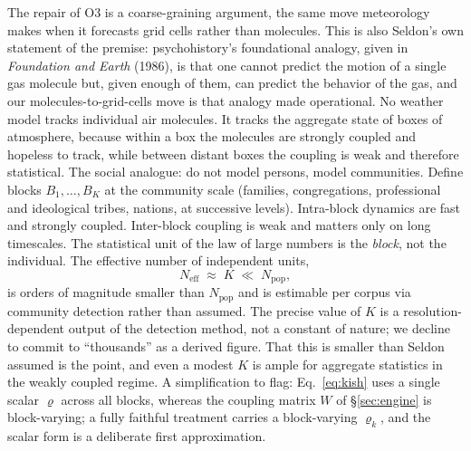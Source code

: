 \documentclass[11pt]{article}
\begin{document}
The repair of O3 is a coarse-graining argument, the same move meteorology makes when it forecasts grid cells rather than molecules. This is also Seldon's own statement of the premise: psychohistory's foundational analogy, given in \emph{Foundation and Earth} (1986), is that one cannot predict the motion of a single gas molecule but, given enough of them, can predict the behavior of the gas, and our molecules-to-grid-cells move is that analogy made operational. No weather model tracks individual air molecules. It tracks the aggregate state of boxes of atmosphere, because within a box the molecules are strongly coupled and hopeless to track, while between distant boxes the coupling is weak and therefore statistical. The social analogue: do not model persons, model communities. Define blocks $B_1,\dots,B_K$ at the community scale (families, congregations, professional and ideological tribes, nations, at successive levels). Intra-block dynamics are fast and strongly coupled. Inter-block coupling is weak and matters only on long timescales. The statistical unit of the law of large numbers is the \emph{block}, not the individual. The effective number of independent units,
\begin{equation}
N_{\mathrm{eff}} \;\approx\; K \;\ll\; N_{\mathrm{pop}},
\end{equation}
is orders of magnitude smaller than $N_{\mathrm{pop}}$ and is estimable per corpus via community detection rather than assumed. The precise value of $K$ is a resolution-dependent output of the detection method, not a constant of nature; we decline to commit to ``thousands'' as a derived figure. That this is smaller than Seldon assumed is the point, and even a modest $K$ is ample for aggregate statistics in the weakly coupled regime. A simplification to flag: Eq.~\eqref{eq:kish} uses a single scalar $\varrho$ across all blocks, whereas the coupling matrix $W$ of \S\ref{sec:engine} is block-varying; a fully faithful treatment carries a block-varying $\varrho_k$, and the scalar form is a deliberate first approximation.
\end{document}

